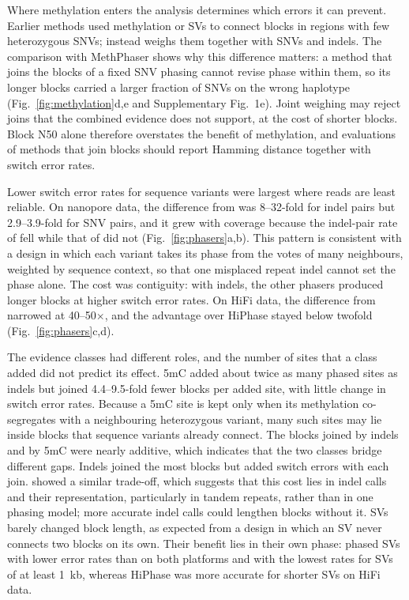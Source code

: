 Where methylation enters the analysis determines which errors it can prevent. Earlier methods used methylation or SVs to connect blocks in regions with few heterozygous SNVs\cite{akbari2021nanomethphase,fu2024methphaser,akbari2023parentoforigin,lin2022longphase,holt2024hiphase}; \toolname instead weighs them together with SNVs and indels. The comparison with MethPhaser shows why this difference matters: a method that joins the blocks of a fixed SNV phasing cannot revise phase within them, so its longer blocks carried a larger fraction of SNVs on the wrong haplotype (Fig.~\ref{fig:methylation}d,e and Supplementary Fig.~1e). Joint weighing may reject joins that the combined evidence does not support, at the cost of shorter blocks. Block N50 alone therefore overstates the benefit of methylation, and evaluations of methods that join blocks should report Hamming distance together with switch error rates.

Lower switch error rates for sequence variants were largest where reads are least reliable. On nanopore data, the difference from \whatshap was 8--32-fold for indel pairs but 2.9--3.9-fold for SNV pairs, and it grew with coverage because the indel-pair rate of \toolname fell while that of \whatshap did not (Fig.~\ref{fig:phasers}a,b). This pattern is consistent with a design in which each variant takes its phase from the votes of many neighbours, weighted by sequence context, so that one misplaced repeat indel cannot set the phase alone. The cost was contiguity: with indels, the other phasers produced longer blocks at higher switch error rates. On HiFi data, the difference from \whatshap narrowed at 40--50$\times$, and the advantage over HiPhase stayed below twofold (Fig.~\ref{fig:phasers}c,d).

The evidence classes had different roles, and the number of sites that a class added did not predict its effect. 5mC added about twice as many phased sites as indels but joined 4.4--9.5-fold fewer blocks per added site, with little change in switch error rates. Because a 5mC site is kept only when its methylation co-segregates with a neighbouring heterozygous variant, many such sites may lie inside blocks that sequence variants already connect. The blocks joined by indels and by 5mC were nearly additive, which indicates that the two classes bridge different gaps. Indels joined the most blocks but added switch errors with each join. \whatshap showed a similar trade-off, which suggests that this cost lies in indel calls and their representation, particularly in tandem repeats, rather than in one phasing model; more accurate indel calls\cite{zheng2026accelerated,kolesnikov2024local} could lengthen blocks without it. SVs barely changed block length, as expected from a design in which an SV never connects two blocks on its own. Their benefit lies in their own phase: \toolname phased SVs with lower error rates than \whatshap on both platforms and with the lowest rates for SVs of at least 1~kb, whereas HiPhase was more accurate for shorter SVs on HiFi data.

